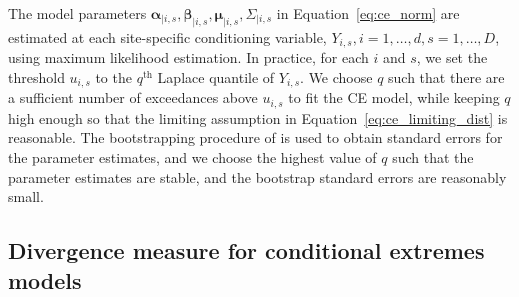 \documentclass[
  12pt]{article}
\begin{document}
The model parameters $\symbf{\alpha}_{\mid i, s}, \symbf{\beta}_{\mid i, s}, \symbf{\mu}_{\mid i, s}, \Sigma_{\mid i, s}$ in Equation~\eqref{eq:ce_norm} are estimated at each site-specific conditioning variable, $Y_{i, s}, i = 1, \ldots, d, s = 1, \ldots, D$, using maximum likelihood estimation. 
In practice, for each $i$ and $s$, we set the threshold $u_{i, s}$ to the $q^{\text{th}}$ Laplace quantile of $Y_{i, s}$. 
We choose $q$ such that there are a sufficient number of exceedances above $u_{i, s}$ to fit the CE model, while keeping $q$ high enough so that the limiting assumption in Equation~\eqref{eq:ce_limiting_dist} is reasonable.
The bootstrapping procedure of \citet{Heffernan2004} is used to obtain standard errors for the parameter estimates, and we choose the highest value of $q$ such that the parameter estimates are stable, and the bootstrap standard errors are reasonably small.

\subsection{Divergence measure for conditional extremes models}~\label{subsec:div}

\end{document}
